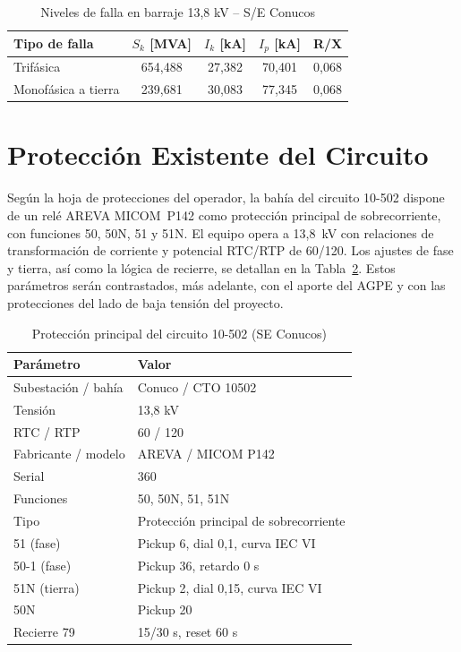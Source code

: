 \begin{table}[H]
    \centering
    \caption{Niveles de falla en barraje 13,8 kV -- S/E Conucos}
    \label{tab:sc_conucos}
    \begin{tabular}{lcccc}
    \toprule
    \textbf{Tipo de falla} & \textbf{$S_k$ [MVA]} & \textbf{$I_k$ [kA]} & \textbf{$I_p$ [kA]} & \textbf{R/X} \\
    \midrule
    Trifásica & 654,488 & 27,382 & 70,401 & 0,068 \\
    Monofásica a tierra & 239,681 & 30,083 & 77,345 & 0,068 \\
    \bottomrule
    \end{tabular}
\end{table}

\section{Protección Existente del Circuito}

Según la hoja de protecciones del operador, la bahía del circuito 10-502 dispone de un relé AREVA MICOM~P142 como protección principal de sobrecorriente, con funciones 50, 50N, 51 y 51N. El equipo opera a 13,8~kV con relaciones de transformación de corriente y potencial RTC/RTP de 60/120. Los ajustes de fase y tierra, así como la lógica de recierre, se detallan en la Tabla~\ref{tab:rele_existente}. Estos parámetros serán contrastados, más adelante, con el aporte del AGPE y con las protecciones del lado de baja tensión del proyecto.

\begin{table}[H]
    \centering
    \small
    \caption{Protección principal del circuito 10-502 (SE Conucos)}
    \label{tab:rele_existente}
    \begin{tabular}{ll}
    \toprule
    \textbf{Parámetro} & \textbf{Valor} \\
    \midrule
    Subestación / bahía & Conuco / CTO 10502 \\
    Tensión & 13,8 kV \\
    RTC / RTP & 60 / 120 \\
    Fabricante / modelo & AREVA / MICOM P142 \\
    Serial & 360 \\
    Funciones & 50, 50N, 51, 51N \\
    Tipo & Protección principal de sobrecorriente \\
    51 (fase) & Pickup 6, dial 0,1, curva IEC VI \\
    50-1 (fase) & Pickup 36, retardo 0 s \\
    51N (tierra) & Pickup 2, dial 0,15, curva IEC VI \\
    50N & Pickup 20 \\
    Recierre 79 & 15/30 s, reset 60 s \\
    \bottomrule
    \end{tabular}
\end{table}

